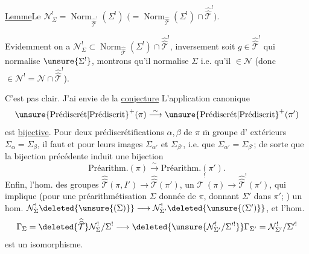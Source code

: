 \uline{Lemme}\quad Le
$\mathcal N^{!}_{\Sigma}=\operatorname{Norm}_{\widehat{\widehat{\mathcal T}}^{!}}(\Sigma^{!})$
$\bigl(=\operatorname{Norm}_{\widehat{\widehat{\mathcal T}}}(\Sigma^{!})\cap
\widehat{\widehat{\mathcal T}}^{!}\bigr)$.


Evidemment on a
$\mathcal N^{!}_{\Sigma}\subset
\operatorname{Norm}_{\widehat{\widehat{\mathcal T}}}(\Sigma^{!})\cap
\widehat{\widehat{\mathcal T}}^{!}$,
inversement soit $g\in\widehat{\widehat{\mathcal T}}^{!}$ qui normalise
$\unsure{\Sigma^{!}}$, montrons qu'il normalise $\Sigma$ i.e.
qu'il  $\in\mathcal N$
(donc $\in\mathcal N^{!}=\mathcal N\cap\widehat{\widehat{\mathcal T}}^{!}$).


C'est pas clair. J'ai  envie de   la
\uline{conjecture} L'application canonique
\[
\unsure{\text{Prédiscrét}|\text{Prédiscrit}}^{+}(\pi)
 \overset{\sim}{\longrightarrow}
\unsure{\text{Prédiscrét}|\text{Prédiscrit}}^{+}(\pi')
\]
est \uline{bijective}. Pour  deux prédiscrétifications 
$\alpha,\beta$ de $\pi$  $\overline{\mathrm m}$ groupe d' extérieurs
$\Sigma_\alpha=\Sigma_\beta$,  il faut et 
 
pour leurs images $\Sigma_{\alpha'}$ et $\Sigma_{\beta'}$, i.e. que
$\Sigma_{\alpha'}=\Sigma_{\beta'}$; de sorte que la bijection précédente induit une bijection
\[
\text{Préarithm.}(\pi)\overset{\sim}{\longrightarrow}\text{Préarithm.}(\pi').
\]
Enfin, 
l'hom. des groupes 
$\widehat{\widehat{\mathcal T}}(\pi,I')\longrightarrow\widehat{\widehat{\mathcal T}}(\pi')$,
 
un $\widehat{\widehat{\mathcal T}}^{!}(\pi)\longrightarrow\widehat{\widehat{\mathcal T}}^{!}(\pi')$,
 qui implique 
(pour une préarithmétisation $\Sigma$ 
donnée de $\pi$, donnant $\Sigma'$ 
dans $\pi'$; ) un
hom.
$\mathcal N_\Sigma^{!}\deleted{\unsure{(\Sigma)}}\longrightarrow
\mathcal N_{\Sigma'}^{!}\deleted{\unsure{(\Sigma')}}$,
 et l'hom. 
\[
\Gamma_\Sigma=\deleted{\widehat{\widehat{\mathcal T}}}\mathcal N_\Sigma^{!}/\Sigma^{!}
 \longrightarrow
\deleted{\unsure{\mathcal N_{\Sigma'}^{!}/\Sigma'^{!}}}\Gamma_{\Sigma'}=\mathcal N_{\Sigma'}^{!}/\Sigma'^{!}
\]
est un isomorphisme.

